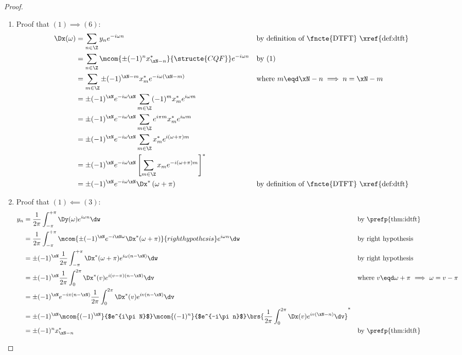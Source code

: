 \begin{proof}
\begin{enumerate}
  \item Proof that $(1)\implies(6)$:
    \begin{align*}
      \Dx(\omega) 
        &= \sum_{n\in\Z}  y_{n}  e^{-i\omega n}
        && \text{by definition of \fncte{DTFT} \xref{def:dtft}}
      \\&= \sum_{n\in\Z} \mcom{\pm (-1)^n x_{\xN-n}^\ast}{\structe{CQF}} e^{-i\omega n}
        && \text{by (1)}
      \\&= \sum_{m\in\Z}\pm (-1)^{\xN-m} x_m^\ast e^{-i\omega (\xN-m)}
        && \text{where } m\eqd\xN-n \implies n=\xN-m
      \\&= \pm (-1)^\xN e^{-i\omega\xN}
           \sum_{m\in\Z}(-1)^m x_m^\ast e^{i\omega m}
      \\&= \pm (-1)^\xN e^{-i\omega\xN}
           \sum_{m\in\Z}e^{i\pi m} x_m^\ast e^{i\omega m}
      \\&= \pm (-1)^\xN e^{-i\omega\xN}
           \sum_{m\in\Z}x_m^\ast e^{i (\omega+\pi )m}
      \\&= \pm (-1)^\xN e^{-i\omega\xN}
           \left[ \sum_{m\in\Z}x_m e^{-i(\omega+\pi )m} \right]^\ast
      \\&= \pm (-1)^\xN e^{-i\omega\xN}\Dx^\ast\left(\omega+\pi \right)
        && \text{by definition of \fncte{DTFT} \xref{def:dtft}}
    \end{align*}

  \item Proof that $(1)\impliedby(3)$:
    \begin{align*}
      y_n
        &= \frac{1}{2\pi}\int_{-\pi}^{+\pi} \Dy(\omega) e^{i\omega n} \dw
        && \text{by \prefp{thm:idtft}}
      \\&= \frac{1}{2\pi}\int_{-\pi}^{+\pi} \mcom{\pm (-1)^\xN e^{-i\xN\omega} \Dx^\ast(\omega+\pi)}{right hypothesis} e^{i\omega n} \dw
        && \text{by right hypothesis}
      \\&= \pm (-1)^\xN\frac{1}{2\pi}\int_{-\pi}^{+\pi}  \Dx^\ast(\omega+\pi) e^{i\omega(n-\xN)} \dw
        && \text{by right hypothesis}
      \\&= \pm (-1)^\xN\frac{1}{2\pi}\int_{0}^{2\pi}  \Dx^\ast(v) e^{i(v-\pi)(n-\xN)} \dv
        && \text{where $v\eqd\omega+\pi$ $\implies$ $\omega=v-\pi$}
      \\&= \pm (-1)^\xN e^{-i\pi(n-\xN)} \frac{1}{2\pi}\int_{0}^{2\pi}  \Dx^\ast(v) e^{iv(n-\xN)} \dv
      \\&= \pm (-1)^\xN \mcom{(-1)^\xN}{$e^{i\pi N}$} \mcom{(-1)^n}{$e^{-i\pi n}$} 
           \brs{\frac{1}{2\pi}\int_{0}^{2\pi}  \Dx(v) e^{iv(\xN-n)} \dv}^\ast
      \\&= \pm (-1)^n x_{\xN-n}^\ast
        && \text{by \prefp{thm:idtft}}
    \end{align*}


\end{enumerate}
\end{proof}
